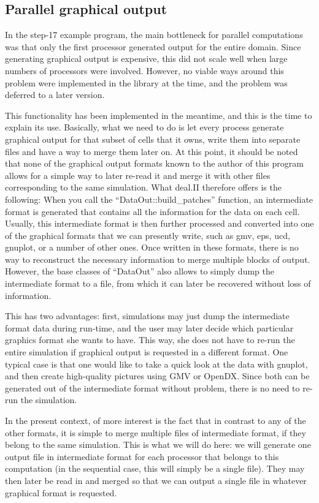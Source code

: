 \documentclass{article}
\begin{document}
\subsection*{Parallel graphical output}

In the step-17 example program, the main bottleneck for parallel computations
was that only the first processor generated output for the entire domain.
Since generating graphical output is expensive, this did not scale well when
large numbers of processors were involved. However, no viable ways around this
problem were implemented in the library at the time, and the problem was
deferred to a later version.

This functionality has been implemented in the meantime, and this is the time
to explain its use. Basically, what we need to do is let every process
generate graphical output for that subset of cells that it owns, write them
into separate files and have a way to merge them later on. At this point, it
should be noted that none of the graphical output formats known to the author
of this program allows for a simple way to later re-read it and merge it with
other files corresponding to the same simulation. What deal.II therefore
offers is the following: When you call the ``DataOut::build\_patches''
function, an intermediate format is generated that contains all the
information for the data on each cell. Usually, this intermediate format is
then further processed and converted into one of the graphical formats that we
can presently write, such as gmv, eps, ucd, gnuplot, or a number of other
ones. Once written in these formats, there is no way to reconstruct the
necessary information to merge multiple blocks of output. However, the base
classes of ``DataOut'' also allows to simply dump the intermediate format to a
file, from which it can later be recovered without loss of information.

This has two advantages: first, simulations may just dump the intermediate
format data during run-time, and the user may later decide which particular
graphics format she wants to have. This way, she does not have to re-run the
entire simulation if graphical output is requested in a different format. One
typical case is that one would like to take a quick look at the data with
gnuplot, and then create high-quality pictures using GMV or OpenDX. Since both
can be generated out of the intermediate format without problem, there is no
need to re-run the simulation.

In the present context, of more interest is the fact that in contrast to any
of the other formats, it is simple to merge multiple files of intermediate
format, if they belong to the same simulation. This is what we will do here:
we will generate one output file in intermediate format for each processor
that belongs to this computation (in the sequential case, this will simply be
a single file). They may then later be read in and merged so that we can
output a single file in whatever graphical format is requested.
\end{document}

